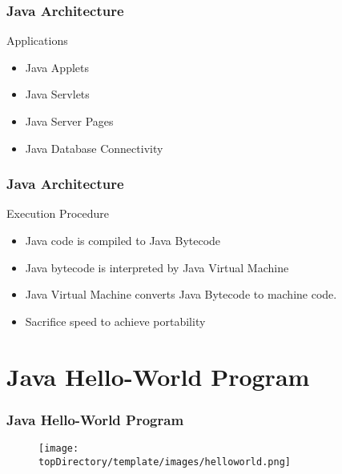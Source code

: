 \documentclass[10pt, compress]{beamer}
\begin{document}
\begin{frame}[fragile]
	\frametitle{Java Architecture}
	\begin{block}{Applications}
		\begin{itemize}
			\item[] Java Applets
			\item[] Java Servlets
			\item[] Java Server Pages
			\item[] Java Database Connectivity
		\end{itemize}
	\end{block}
\end{frame}

\begin{frame}[fragile]
	\frametitle{Java Architecture}
	\begin{block}{Execution Procedure}
		\begin{itemize}
			\item[] Java code is compiled to Java Bytecode
			\item[] Java bytecode is interpreted by Java Virtual Machine
			\item[] Java Virtual Machine converts Java Bytecode to machine code.
			\item[] Sacrifice speed to achieve portability
		\end{itemize}
	\end{block}
\end{frame}

\section{Java Hello-World Program}

\begin{frame}[fragile]
	\frametitle{Java Hello-World Program}
	\begin{figure}
		\texttt{[image: \\topDirectory/template/images/helloworld.png]}
	\end{figure}
\end{frame}
\end{document}
